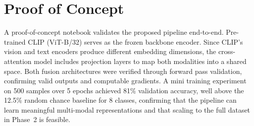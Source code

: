\documentclass[conference]{IEEEtran}
\begin{document}
\section{Proof of Concept}

A proof-of-concept notebook validates the proposed pipeline end-to-end. Pre-trained CLIP (ViT-B/32) serves as the frozen backbone encoder. Since CLIP's vision and text encoders produce different embedding dimensions, the cross-attention model includes projection layers to map both modalities into a shared space. Both fusion architectures were verified through forward pass validation, confirming valid outputs and computable gradients. A mini training experiment on 500 samples over 5 epochs achieved 81\% validation accuracy, well above the 12.5\% random chance baseline for 8 classes, confirming that the pipeline can learn meaningful multi-modal representations and that scaling to the full dataset in Phase~2 is feasible.
\end{document}
